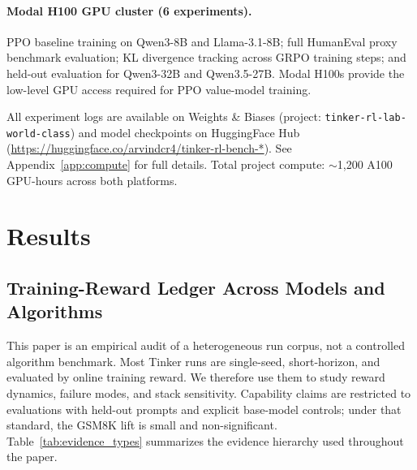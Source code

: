 \documentclass{article}
\begin{document}
\paragraph{Modal H100 GPU cluster (6 experiments).}
PPO baseline training on Qwen3-8B and Llama-3.1-8B; full HumanEval
proxy benchmark evaluation; KL divergence tracking across GRPO training steps;
and held-out evaluation for Qwen3-32B and Qwen3.5-27B. Modal H100s
provide the low-level GPU access required for PPO value-model training.

All experiment logs are available on Weights \& Biases (project:
\texttt{tinker-rl-lab-world-class}) and model checkpoints on HuggingFace
Hub (\url{https://huggingface.co/arvindcr4/tinker-rl-bench-*}).
See Appendix~\ref{app:compute} for full details. Total project compute:
$\sim$1,200 A100 GPU-hours across both platforms.

\section{Results}
\label{sec:results}

\subsection{Training-Reward Ledger Across Models and Algorithms}
\label{sec:main_results}

This paper is an empirical audit of a heterogeneous run corpus, not a controlled
algorithm benchmark. Most Tinker runs are single-seed, short-horizon, and
evaluated by online training reward. We therefore use them to study reward
dynamics, failure modes, and stack sensitivity. Capability claims are restricted
to evaluations with held-out prompts and explicit base-model controls; under that
standard, the GSM8K lift is small and non-significant. Table~\ref{tab:evidence_types}
summarizes the evidence hierarchy used throughout the paper.
\end{document}
